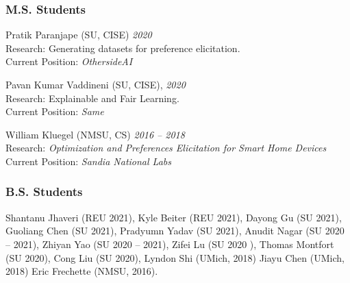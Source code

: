 \subsubsection*{M.S. Students}
\beginList

	\item Pratik Paranjape (SU, CISE) \hfill{\em 2020}\\
	Research: Generating datasets for preference elicitation.\\
	Current Position: \textit{OthersideAI}

	\item Pavan Kumar Vaddineni  (SU, CISE), \hfill{\em 2020}\\
	Research: Explainable and Fair Learning.\\
	Current Position: \textit{Same}



	\item {William Kluegel} (NMSU, CS) \hfill{\em 2016 -- 2018} \\
		Research: \textit{Optimization and Preferences Elicitation for Smart Home Devices}\\
		Current Position: \textit{Sandia National Labs}

					
\endList


\subsubsection*{B.S. Students}
	{Shantanu Jhaveri} (REU 2021), %
	{Kyle Beiter} (REU 2021),  %
	{Dayong Gu} (SU 2021),
	{Guoliang Chen} (SU 2021),
	{Pradyumn Yadav} (SU 2021),
	{Anudit Nagar} (SU 2020 -- 2021), 
	{Zhiyan Yao} (SU 2020 -- 2021),
	Zifei Lu (SU 2020 ),
	Thomas Montfort (SU 2020),
	Cong Liu (SU 2020),
	{Lyndon Shi} (UMich, 2018)
	Jiayu Chen (UMich, 2018)
	Eric Frechette (NMSU, 2016).



